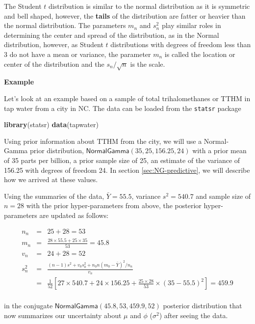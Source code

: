 \documentclass[]{book}
\newenvironment{Shaded}{\begin{snugshade}}{\end{snugshade}}
\newcommand{\KeywordTok}[1]{\textcolor[rgb]{0.13,0.29,0.53}{\textbf{#1}}}
\newcommand{\NormalTok}[1]{#1}
\theoremstyle{definition}
\theoremstyle{definition}
\theoremstyle{remark}
\begin{document}
The Student \(t\) distribution is similar to the normal distribution as
it is symmetric and bell shaped, however, the \textbf{tails} of the
distribution are fatter or heavier than the normal distribution. The
parameters \(m_n\) and \(s^2_n\) play similar roles in determining the
center and spread of the distribution, as in the Normal distribution,
however, as Student \(t\) distributions with degrees of freedom less
than 3 do not have a mean or variance, the parameter \(m_n\) is called
the location or center of the distribution and the \(s_n/\sqrt{n}\) is
the scale.

\textbf{Example}

Let's look at an example based on a sample of total trihalomethanes or
TTHM in tap water from a city in NC. The data can be loaded from the
\texttt{statsr} package

\begin{Shaded}
\begin{Highlighting}[]
\KeywordTok{library}\NormalTok{(statsr)}
\KeywordTok{data}\NormalTok{(tapwater)}
\end{Highlighting}
\end{Shaded}

Using prior information about TTHM from the city, we will use a
Normal-Gamma prior distribution,
\(\textsf{NormalGamma}(35, 25, 156.25, 24)\) with a prior mean of 35
parts per billion, a prior sample size of 25, an estimate of the
variance of 156.25 with degrees of freedom 24. In section
\ref{sec:NG-predictive}, we will describe how we arrived at these
values.

Using the summaries of the data, \(\bar{Y} = 55.5\), variance
\(s^2 = 540.7\) and sample size of \(n = 28\) with the prior
hyper-parameters from above, the posterior hyper-parameters are updated
as follows:

\begin{eqnarray*}
n_n & = &  25 +  28 = 53\\
m_n  & = & \frac{28 \times55.5 + 25 \times35}{53} = 45.8  \\
v_n & = & 24 + 28 = 52  \\
s^2_n & = & \frac{(n-1) s^2 + v_0 s^2_0 + n_0 n (m_0 - \bar{Y})^2 /n_n }{v_n}  \\
  & = & \frac{1}{52}
     \left[27 \times 540.7 +
          24 \times 156.25  +
          \frac{25 \times 28}{53} \times (35 - 55.5)^2
\right] = 459.9  \\
\end{eqnarray*}

in the conjugate \(\textsf{NormalGamma}(45.8, 53, 459.9, 52)\) posterior
distribution that now summarizes our uncertainty about \(\mu\) and
\(\phi\) (\(\sigma^2\)) after seeing the data.
\end{document}
